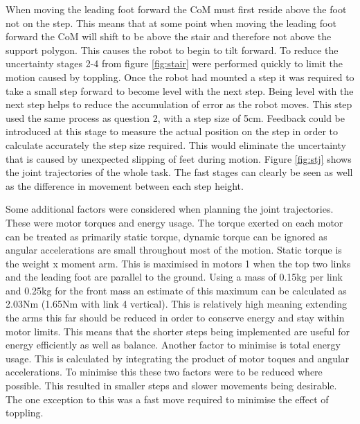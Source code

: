 \documentclass[twoside,twocolumn]{article}
\begin{document}
When moving the leading foot forward the CoM must first reside above the foot not on the step. This means that at some point when moving the leading foot forward the CoM will shift to be above the stair and therefore not above the support polygon. This causes the robot to begin to tilt forward. To reduce the uncertainty stages 2-4 from figure \ref{fig:stair} were performed quickly to limit the motion caused by toppling. 
\newline
Once the robot had mounted a step it was required to take a small step forward to become level with the next step. Being level with the next step helps to reduce the accumulation of error as the robot moves. This step used the same process as question 2, with a step size of 5cm. Feedback could be introduced at this stage to measure the actual position on the step in order to calculate accurately the step size required. This would eliminate the uncertainty that is caused by unexpected slipping of feet during motion.
\newline
Figure \ref{fig:stj} shows the joint trajectories of the whole task. The fast stages can clearly be seen as well as the difference in movement between each step height.

Some additional factors were considered when planning the joint trajectories. These were motor torques and energy usage. The torque exerted on each motor can be treated as primarily static torque, dynamic torque can be ignored as angular accelerations are small throughout most of the motion. Static torque is the weight x moment arm. This is maximised in motors 1 when the top two links and the leading foot are parallel to the ground. Using a mass of 0.15kg per link and 0.25kg for the front mass an estimate of this maximum can be calculated as 2.03Nm (1.65Nm with link 4 vertical). This is relatively high meaning extending the arms this far should be reduced in order to conserve energy and stay within motor limits. This means that the shorter steps being implemented are useful for energy efficiently as well as balance.
\newline
Another factor to minimise is total energy usage. This is calculated by integrating the product of motor toques and angular accelerations. To minimise this these two factors were to be reduced where possible. This resulted in smaller steps and slower movements being desirable. The one exception to this was a fast move required to minimise the effect of toppling.
\end{document}
